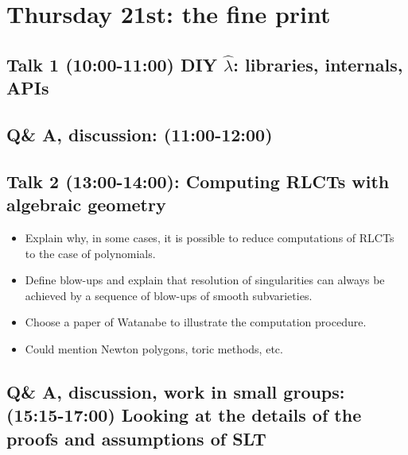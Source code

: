 \documentclass[a4paper,11pt]{amsart}
\newcommand{\lambdahat}{\widehat{\lambda}}
\begin{document}
\section*{Thursday 21st: the fine print}

\subsection*{Talk 1 (10:00-11:00) DIY $\lambdahat$: libraries, internals, APIs}

\subsection*{Q\& A, discussion: (11:00-12:00)}

\subsection*{Talk 2 (13:00-14:00): Computing RLCTs with algebraic geometry}

\begin{itemize}
\item Explain why, in some cases, it is possible to reduce computations of RLCTs to the case of polynomials.
\item Define blow-ups and explain that resolution of singularities can always be achieved by a sequence of blow-ups of smooth subvarieties.  
\item Choose a paper of Watanabe to illustrate the computation procedure.
\item Could mention Newton polygons, toric methods, etc.
\end{itemize}

\subsection*{Q\& A, discussion, work in small groups: (15:15-17:00) Looking at the details of the proofs and assumptions of SLT}
\end{document}
